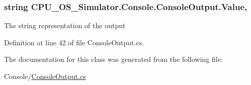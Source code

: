 \subsubsection[{Value}]{\setlength{\rightskip}{0pt plus 5cm}string C\+P\+U\+\_\+\+O\+S\+\_\+\+Simulator.\+Console.\+Console\+Output.\+Value\hspace{0.3cm}{\ttfamily [get]}, {\ttfamily [set]}}\label{class_c_p_u___o_s___simulator_1_1_console_1_1_console_output_a1a5c833114630e4739546948e8622cbd}


The string representation of the output 



Definition at line 42 of file Console\+Output.\+cs.



The documentation for this class was generated from the following file\+:\begin{DoxyCompactItemize}
\item 
Console/\hyperlink{_console_output_8cs}{Console\+Output.\+cs}\end{DoxyCompactItemize}
